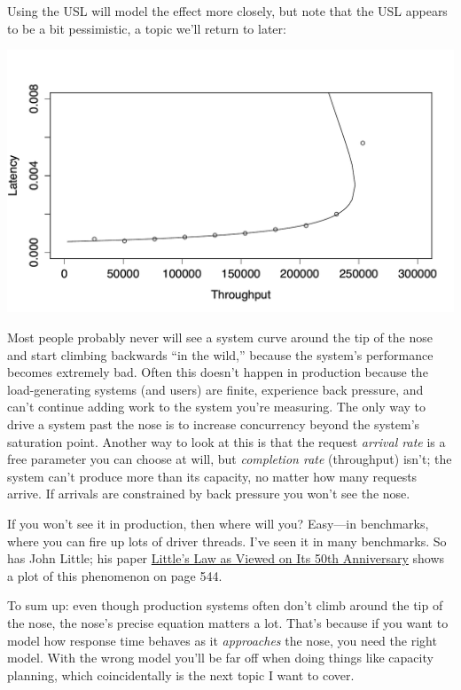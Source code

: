 \documentclass{vivid_layout}
\begin{document}
Using the USL will model the effect more closely, but note that the USL appears
to be a bit pessimistic, a topic we'll return to later:
\begin{center}
\includegraphics[width=.85\linewidth]{scalability/nose-isilon}
\end{center}

Most people probably never will see a system curve around the tip of the nose
and start climbing backwards ``in the wild,'' because the system's performance
becomes extremely bad.  Often this doesn't happen in production because the
load-generating systems (and users) are finite, experience back pressure, and
can't continue adding work to the system you're measuring.  The only way to
drive a system past the nose is to increase concurrency beyond the system's
saturation point.  Another way to look at this is that the request {\itshape
arrival rate} is a free parameter you can choose at will, but {\itshape
completion rate} (throughput) isn't; the system can't produce more than its
capacity, no matter how many requests arrive. If arrivals are constrained by
back pressure you won't see the nose.

If you won't see it in production, then where will you? Easy---in benchmarks,
where you can fire up lots of driver threads. I've seen it in many benchmarks.
So has John Little; his paper
\href{https://people.cs.umass.edu/~emery/classes/cmpsci691st/readings/OS/Littles-Law-50-Years-Later.pdf}{Little’s
Law as Viewed on Its 50th Anniversary} shows a plot of this phenomenon on page
544.

To sum up: even though production systems often don't climb around the tip of
the nose, the nose's precise equation matters a lot. That's because if you want
to model how response time behaves as it {\itshape approaches} the nose, you
need the right model. With the wrong model you'll be far off when doing things
like capacity planning, which coincidentally is the next topic I want to cover.
\end{document}
